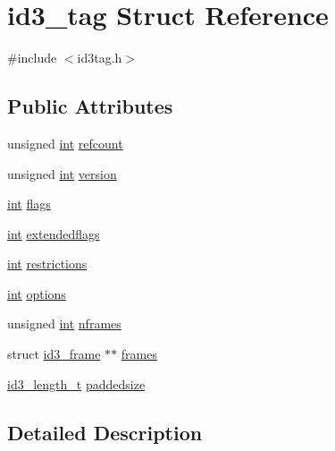 \hypertarget{structid3__tag}{}\section{id3\+\_\+tag Struct Reference}
\label{structid3__tag}


{\ttfamily \#include $<$id3tag.\+h$>$}

\subsection*{Public Attributes}
\begin{DoxyCompactItemize}
\item 
unsigned \hyperlink{xmltok_8h_a5a0d4a5641ce434f1d23533f2b2e6653}{int} \hyperlink{structid3__tag_aa2a5d470661f86bd8760bb84267d8216}{refcount}
\item 
unsigned \hyperlink{xmltok_8h_a5a0d4a5641ce434f1d23533f2b2e6653}{int} \hyperlink{structid3__tag_ad8a634ed8b0daf8d8fafffd04e4f3058}{version}
\item 
\hyperlink{xmltok_8h_a5a0d4a5641ce434f1d23533f2b2e6653}{int} \hyperlink{structid3__tag_aa59f252be53abc68604a94b3891ecae7}{flags}
\item 
\hyperlink{xmltok_8h_a5a0d4a5641ce434f1d23533f2b2e6653}{int} \hyperlink{structid3__tag_a163849909cfa3cbe990075b345448789}{extendedflags}
\item 
\hyperlink{xmltok_8h_a5a0d4a5641ce434f1d23533f2b2e6653}{int} \hyperlink{structid3__tag_aecfeed1b65c8b5151084c15d0d8348f9}{restrictions}
\item 
\hyperlink{xmltok_8h_a5a0d4a5641ce434f1d23533f2b2e6653}{int} \hyperlink{structid3__tag_a4d383bbf55e70cbd7549e7ebefafecbc}{options}
\item 
unsigned \hyperlink{xmltok_8h_a5a0d4a5641ce434f1d23533f2b2e6653}{int} \hyperlink{structid3__tag_a5f09491a7f0ef26ddcbe17cd5cfbf0f4}{nframes}
\item 
struct \hyperlink{structid3__frame}{id3\+\_\+frame} $\ast$$\ast$ \hyperlink{structid3__tag_afce1159c8d3da137ffaee2744acc4049}{frames}
\item 
\hyperlink{id3tag_8h_a26fddaa5bcd55c38142a1fbed8d2835d}{id3\+\_\+length\+\_\+t} \hyperlink{structid3__tag_ae13479043b2d821d070d55a381b07013}{paddedsize}
\end{DoxyCompactItemize}


\subsection{Detailed Description}


